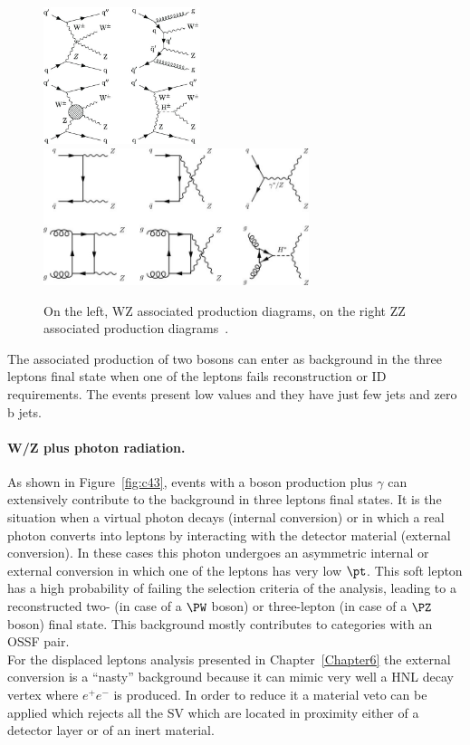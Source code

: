 \begin{figure}[h!]
\centering
  \includegraphics[height = 4cm]{Figures/c4/dia/WZjj-production.jpeg}
\hspace{1cm}
  \includegraphics[height = 4cm]{Figures/c4/dia/Lowest-order-Feynman-diagrams-for-ZZ-production.jpeg}
  \caption{On the left, WZ associated production diagrams, on the
    right ZZ associated production diagrams~\cite{diagram}.}
  \label{fig:c41}
\end{figure}
The associated production of two \PZ bosons can enter as background in
the three leptons final state when one of the leptons fails
reconstruction or ID requirements. The events present low \ptmiss
values and they have just few jets and zero b jets. 


\paragraph{W/Z plus photon radiation.}\label{sec:c4photon}
As shown in Figure~\ref{fig:c43}, events with a boson production plus
$\gamma$ can extensively contribute to the background in three leptons
final states. It is the situation when a virtual photon decays (internal conversion) or in which a real photon
converts into leptons by interacting with the detector material
(external conversion). In these cases this photon undergoes an
asymmetric internal or external conversion in which one of the leptons
has very low $\pt$. This soft lepton has a high probability of failing
the selection criteria of the analysis, leading to a reconstructed
two- (in case of a $\PW$ boson) or three-lepton (in case of a $\PZ$
boson) final state. This background mostly contributes to categories
with an OSSF pair.\\
For the displaced leptons analysis presented in Chapter~\ref{Chapter6}
the external conversion is a ``nasty'' background because it can mimic
very well a HNL decay vertex where $e^{+}e^{-}$ is produced. In order
to reduce it a material veto can be applied which rejects all the SV
which are located in proximity either of a detector layer or of an inert material.

